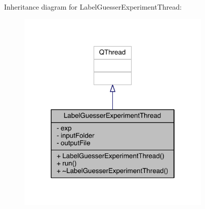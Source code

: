 Inheritance diagram for Label\+Guesser\+Experiment\+Thread\+:
\nopagebreak
\begin{figure}[H]
\begin{center}
\leavevmode
\includegraphics[width=262pt]{class_label_guesser_experiment_thread__inherit__graph}
\end{center}
\end{figure}


